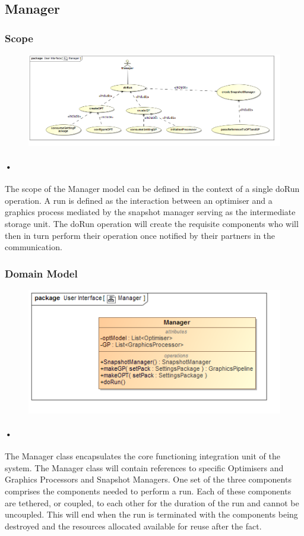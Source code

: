 \documentclass[11pt]{article}
\begin{document}
\subsection{Manager}
\subsubsection{Scope}
\begin{figure}[H]
\includegraphics[scale=0.45]{Manager.png}
\end{figure}
\paragraph{•}
The scope of the Manager model can be defined in the context of a single doRun operation. A run is defined as the interaction between an optimiser and a graphics process mediated by the snapshot manager serving as the intermediate storage unit. The doRun operation will create the requisite components who will then in turn perform their operation once notified by their partners in the communication.

\subsubsection{Domain Model}
\begin{figure}[H]
\includegraphics[scale=0.45]{ManagerModel.png}
\end{figure}
\paragraph{•}
The Manager class encapsulates the core functioning integration unit of the system. The Manager class will contain references to specific Optimisers and Graphics Processors and Snapshot Managers. One set of the three components comprises the components needed to perform a run. Each of these components are tethered, or coupled, to each other for the duration of the run and cannot be uncoupled. This will end when the run is terminated with the components being destroyed and the resources allocated available for reuse after the fact.
\end{document}
